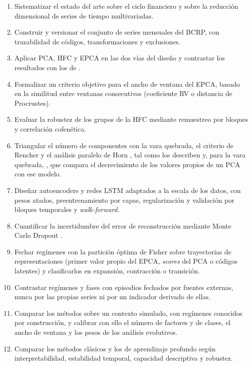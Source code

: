 \begin{enumerate}[label=\textbf{OE\arabic*.}, ref=OE\arabic*, leftmargin=*]
  \item\label{oe:estado-arte} Sistematizar el estado del arte sobre el ciclo financiero y sobre
    la reducción dimensional de series de tiempo multivariadas.
  \item\label{oe:datos} Construir y versionar el conjunto de series mensuales del BCRP, con
    trazabilidad de códigos, transformaciones y exclusiones.
  \item\label{oe:clasicos} Aplicar PCA, HFC y EPCA en las dos vías del diseño y contrastar los
    resultados con los de \textcite{camiz_cerda_atoche_2026}.
  \item\label{oe:ventana} Formalizar un criterio objetivo para el ancho de ventana del EPCA,
    basado en la similitud entre ventanas consecutivas (coeficiente RV o distancia de
    Procrustes).
  \item\label{oe:robustez-hfc} Evaluar la robustez de los grupos de la HFC mediante remuestreo
    por bloques y correlación cofenética.
  \item\label{oe:dimension} Triangular el número de componentes con la vara quebrada, el
    criterio de Rencher y el análisis paralelo de Horn
    \parencite{horn_1965}, tal como los describen \textcite{camiz_pillar_2018}
    y, para la vara quebrada, \textcite{frontier_1976}, que
    compara el decrecimiento de los valores propios de un PCA con ese modelo.
  \item\label{oe:dl} Diseñar autoencoders y redes LSTM adaptados a la escala de los datos, con
    pesos atados, preentrenamiento por capas, regularización y validación por bloques temporales
    y \emph{walk-forward}.
  \item\label{oe:incertidumbre} Cuantificar la incertidumbre del error de reconstrucción
    mediante Monte Carlo Dropout
    \parencite{gal_ghahramani_2016}.
  \item\label{oe:datacion} Fechar regímenes con la partición óptima de Fisher sobre
    trayectorias de representaciones (primer valor propio del EPCA, \emph{scores} del PCA o
    códigos latentes) y clasificarlos en expansión, contracción o transición.
  \item\label{oe:episodios} Contrastar regímenes y fases con episodios fechados por fuentes
    externas, nunca por las propias series ni por un indicador derivado de ellas.
  \item\label{oe:simulado} Comparar los métodos sobre un contexto simulado, con regímenes
    conocidos por construcción, y calibrar con ello el número de factores y de clases, el ancho
    de ventana y los pesos de los análisis evolutivos.
  \item\label{oe:comparacion} Comparar los métodos clásicos y los de aprendizaje profundo según
    interpretabilidad, estabilidad temporal, capacidad descriptiva y robustez.
\end{enumerate}

